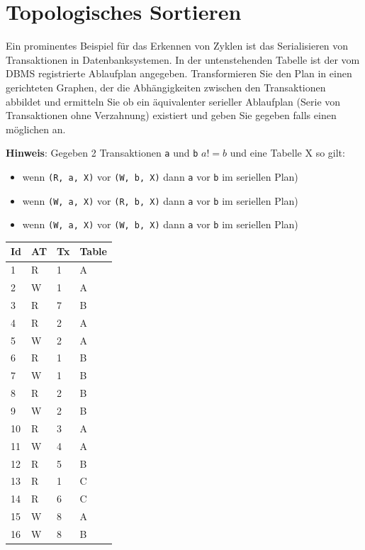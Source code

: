 \documentclass[a4paper,11pt]{report}
\begin{document}
\chapter{Topologisches Sortieren}
Ein prominentes Beispiel für das Erkennen von Zyklen ist das Serialisieren von Transaktionen in Datenbanksystemen.
In der untenstehenden Tabelle ist der vom DBMS registrierte Ablaufplan angegeben.
Transformieren Sie den Plan in einen gerichteten Graphen, der die Abhängigkeiten zwischen den Transaktionen abbildet und ermitteln Sie ob ein äquivalenter serieller Ablaufplan
(Serie von Transaktionen ohne Verzahnung)
existiert und geben Sie gegeben falls einen möglichen an.

\textbf{Hinweis}: Gegeben 2 Transaktionen \texttt{a} und \texttt{b} $a != b$ und eine Tabelle X so gilt:

\begin{itemize}
    \item wenn \texttt{(R, a, X)} vor \texttt{(W, b, X)} dann \texttt{a} vor \texttt{b} im seriellen Plan)
    \item wenn \texttt{(W, a, X)} vor \texttt{(R, b, X)} dann \texttt{a} vor \texttt{b} im seriellen Plan)
    \item wenn \texttt{(W, a, X)} vor \texttt{(W, b, X)} dann \texttt{a} vor \texttt{b} im seriellen Plan)
\end{itemize}

\begin{table}[htbp]
    \begin{tabular}{|l|l|l|l|}
        \hline
        Id & AT & Tx & Table \\ \hline
        1  & R  & 1  & A     \\ \hline
        2  & W  & 1  & A     \\ \hline
        3  & R  & 7  & B     \\ \hline
        4  & R  & 2  & A     \\ \hline
        5  & W  & 2  & A     \\ \hline
        6  & R  & 1  & B     \\ \hline
        7  & W  & 1  & B     \\ \hline
        8  & R  & 2  & B     \\ \hline
        9  & W  & 2  & B     \\ \hline
        10 & R  & 3  & A     \\ \hline
        11 & W  & 4  & A     \\ \hline
        12 & R  & 5  & B     \\ \hline
        13 & R  & 1  & C     \\ \hline
        14 & R  & 6  & C     \\ \hline
        15 & W  & 8  & A     \\ \hline
        16 & W  & 8  & B     \\ \hline
    \end{tabular}
\end{table}
\end{document}
